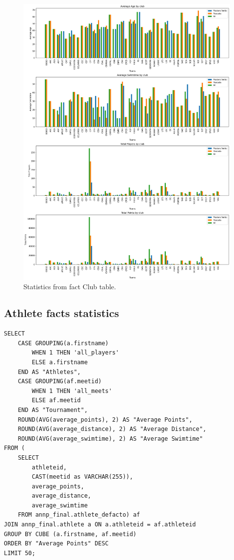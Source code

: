 \begin{figure}[H]
    \centering
    \includegraphics[width=\textwidth]{img/clubdefactostats.png}
    \caption{Statistics from fact Club table.}
    \label{fig:clubs_fact}
\end{figure}

\subsection{Athlete facts statistics}

\begin{verbatim}
SELECT
    CASE GROUPING(a.firstname)
        WHEN 1 THEN 'all_players'
        ELSE a.firstname
    END AS "Athletes",
    CASE GROUPING(af.meetid)
        WHEN 1 THEN 'all_meets'
        ELSE af.meetid
    END AS "Tournament",
    ROUND(AVG(average_points), 2) AS "Average Points",
    ROUND(AVG(average_distance), 2) AS "Average Distance",
    ROUND(AVG(average_swimtime), 2) AS "Average Swimtime"
FROM (
    SELECT
        athleteid,
        CAST(meetid as VARCHAR(255)),
        average_points,
        average_distance,
        average_swimtime
    FROM annp_final.athlete_defacto) af
JOIN annp_final.athlete a ON a.athleteid = af.athleteid
GROUP BY CUBE (a.firstname, af.meetid)
ORDER BY "Average Points" DESC
LIMIT 50;
\end{verbatim}


